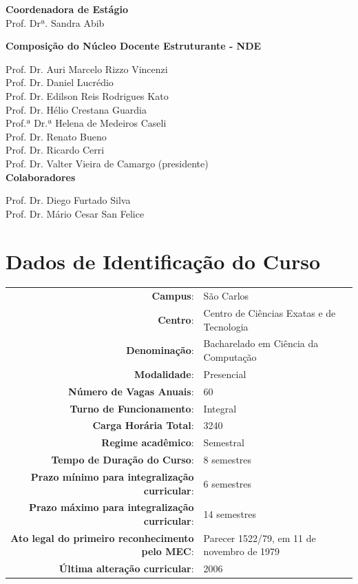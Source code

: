 \begin{center}
\vspace{2ex}
\textbf{Coordenadora de Estágio}\\
Prof. Drª. Sandra Abib

\vspace{2ex}
\textbf{Composição do Núcleo Docente Estruturante - NDE}

Prof. Dr. Auri Marcelo Rizzo Vincenzi\\
Prof. Dr. Daniel Lucrédio\\
Prof. Dr. Edilson Reis Rodrigues Kato\\
Prof. Dr. Hélio Crestana Guardia\\
Prof.ª Dr.ª Helena de Medeiros Caseli\\
Prof. Dr. Renato Bueno\\
Prof. Dr. Ricardo Cerri\\
Prof. Dr. Valter Vieira de Camargo (presidente)\\

\vspace{2ex}
\textbf{Colaboradores}

Prof. Dr. Diego Furtado Silva\\
Prof. Dr. Mário Cesar San Felice\\ 

\end{center}


\clearpage


\label{dados}\chapter*{Dados de Identificação do Curso}

\begin{tabular}{rl}
\hline
\textbf{Campus}: & São Carlos \\
\textbf{Centro}: & Centro de Ciências Exatas e de Tecnologia \\
\textbf{Denominação}: & Bacharelado em Ciência da Computação  \\
\textbf{Modalidade}: & Presencial \\
\textbf{Número de Vagas Anuais}: & 60 \\
\textbf{Turno de Funcionamento}: & Integral \\
\textbf{Carga Horária Total}: & 3240 \\ %
\textbf{Regime acadêmico}: & Semestral \\
\textbf{Tempo de Duração do Curso}: & 8 semestres \\
\textbf{Prazo mínimo para integralização curricular}: & 6 semestres \\
\textbf{Prazo máximo para integralização curricular}: & 14 semestres \\
\textbf{Ato legal do primeiro reconhecimento pelo MEC}: & Parecer 1522/79, em 11 de novembro de 1979 \\ %
\textbf{Última alteração curricular}: & 2006 \\
\hline
\end{tabular}
